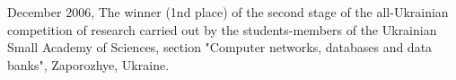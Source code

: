 \documentclass[helvetica,openbib,nologo,notitle,totpages]{europecv}
\begin{document}
\begin{europecv}
{\begin{list}{\textbullet}{}
	\item December 2006, The winner (1nd place) of the second stage of the all-Ukrainian competition of research carried out by the students-members of the Ukrainian Small Academy of Sciences, section "Computer networks, databases and data banks", Zaporozhye, Ukraine.	
	
\end{list}
}






\end{europecv}
\end{document}

